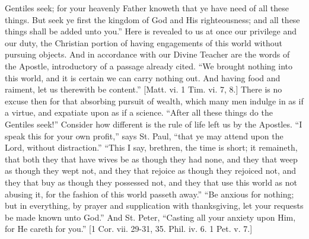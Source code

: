Gentiles seek; for your heavenly Father knoweth that ye have need of all
these things. But seek ye first the kingdom of God and His
righteousness; and all these things shall be added unto you.'' Here
is revealed to us at once our privilege and our duty, the Christian
portion of having engagements of this world without pursuing objects.
And in accordance with our Divine Teacher are the words of the Apostle,
introductory of a passage already cited. ``We brought nothing into
this world, and it is certain we can carry nothing out. And having food
and raiment, let us therewith be content.'' [Matt. vi. 1 Tim.
vi. 7, 8.] There is no excuse then for that absorbing pursuit of wealth,
which many men indulge in as if a virtue, and expatiate upon as if a
science. ``After all these things do the Gentiles seek!''
Consider how different is the rule of life left us by the Apostles.
``I speak this for your own profit,'' says St. Paul, ``that
ye may attend upon the Lord, without distraction.'' ``This I
say, brethren, the time is short; it remaineth, that both they that have
wives be as though they had none, and they that weep as though they wept
not, and they that rejoice as though they rejoiced not, and they that
buy as though they possessed not, and they that use this world as not
abusing it, for the fashion of this world passeth away.'' ``Be
anxious for nothing; but in everything, by prayer and supplication with
thanksgiving, let your requests be made known unto God.'' And St.
Peter, ``Casting all your anxiety upon Him, for He careth for
you.'' [1 Cor. vii. 29-31, 35. Phil. iv. 6. 1 Pet. v. 7.]

